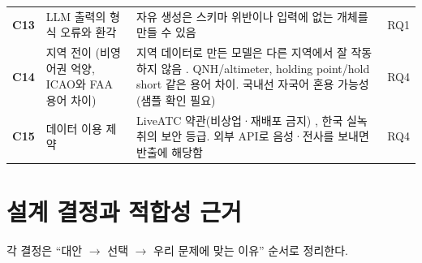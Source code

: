 \documentclass[10pt,a4paper]{article}
\newcommand{\ch}[1]{\textbf{\textcolor{red!60!black}{#1}}}
\begin{document}
\begin{center}
\begin{tabularx}{\textwidth}{@{}l>{\raggedright\arraybackslash}p{3.6cm}>{\raggedright\arraybackslash}X l@{}}
\ch{C13} & LLM 출력의 형식 오류와 환각 & 자유 생성은 스키마 위반이나 입력에 없는 개체를 만들 수 있음 \cite{willard2023,itext2kg} & RQ1\\
\ch{C14} & 지역 전이 (비영어권 억양, ICAO와 FAA 용어 차이) & 지역 데이터로 만든 모델은 다른 지역에서 잘 작동하지 않음 \cite{chen2023,usatc2025}. QNH/altimeter, holding point/hold short 같은 용어 차이. 국내선 자국어 혼용 가능성(샘플 확인 필요) & RQ4\\
\ch{C15} & 데이터 이용 제약 & LiveATC 약관(비상업·재배포 금지) \cite{hfliveatc}, 한국 실녹취의 보안 등급. 외부 API로 음성·전사를 보내면 반출에 해당함 & RQ4\\
\bottomrule
\end{tabularx}
\end{center}

\section{설계 결정과 적합성 근거}\label{sec:design}
각 결정은 ``대안 $\to$ 선택 $\to$ 우리 문제에 맞는 이유'' 순서로 정리한다.
\end{document}
